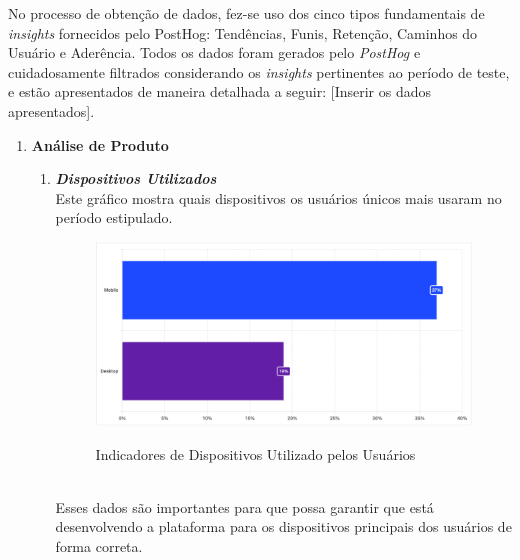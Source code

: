 No processo de obtenção de dados, fez-se uso dos cinco tipos fundamentais de \textit{insights} fornecidos pelo PostHog: Tendências, Funis, Retenção, Caminhos do Usuário e Aderência. Todos os dados foram gerados pelo \textit{PostHog} e cuidadosamente filtrados considerando os \textit{insights} pertinentes ao período de teste, e estão apresentados de maneira detalhada a seguir: [Inserir os dados apresentados].
\begin{enumerate}
    \item\textbf{Análise de Produto}
    \begin{enumerate}
        \item\textit{\textbf{Dispositivos Utilizados}}\\
 Este gráfico mostra quais dispositivos os usuários únicos mais usaram no período estipulado.
\begin{figure}[!ht]
    \centering
    \includegraphics[scale=0.45]{latex/figuras/disp.pdf}
    \label{disp}
    \caption[Dispositivos Utilizados]{Indicadores de Dispositivos Utilizado pelos Usuários}
    \label{fig:enter-label}
\end{figure}\\
 Esses dados são importantes para que possa garantir que está desenvolvendo a plataforma para os dispositivos principais dos usuários de forma correta.


\end{enumerate}
\end{enumerate}

